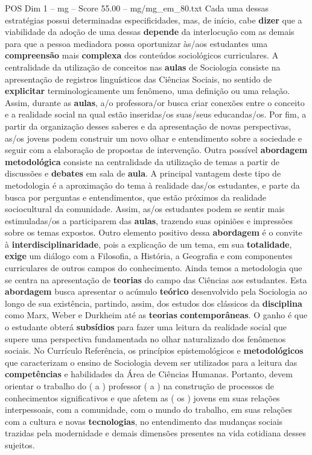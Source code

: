 \begin{textsample}{POS Dim 1 – mg – Score 55.00 – mg/mg\_em\_80.txt}
Cada uma dessas estratégias possui determinadas especificidades, mas, de início, cabe \textbf{dizer} que a viabilidade da adoção de uma dessas \textbf{depende} da interlocução com as demais para que a pessoa mediadora possa oportunizar às/aos estudantes uma \textbf{compreensão} mais \textbf{complexa} dos conteúdos sociológicos curriculares.
A centralidade da utilização de conceitos nas \textbf{aulas} de Sociologia consiste na apresentação de registros linguísticos das Ciências Sociais, no sentido de \textbf{explicitar} terminologicamente um fenômeno, uma definição ou uma relação.
Assim, durante as \textbf{aulas}, a/o professora/or busca criar conexões entre o conceito e a realidade social na qual estão inseridas/os suas/seus educandas/os.
Por fim, a partir da organização desses saberes e da apresentação de novas perspectivas, as/os jovens podem construir um novo olhar e entendimento sobre a sociedade e seguir com a elaboração de propostas de intervenção.
Outra possível \textbf{abordagem} \textbf{metodológica} consiste na centralidade da utilização de temas a partir de discussões e \textbf{debates} em sala de \textbf{aula}.
A principal vantagem deste tipo de metodologia é a aproximação do tema à realidade das/os estudantes, e parte da busca por perguntas e entendimentos, que estão próximos da realidade sociocultural da comunidade.
Assim, as/os estudantes podem se sentir mais estimuladas/os a participarem das \textbf{aulas}, trazendo suas opiniões e impressões sobre os temas expostos.
Outro elemento positivo dessa \textbf{abordagem} é o convite à \textbf{interdisciplinaridade}, pois a explicação de um tema, em sua \textbf{totalidade}, \textbf{exige} um diálogo com a Filosofia, a História, a Geografia e com componentes curriculares de outros campos do conhecimento.
Ainda temos a metodologia que se centra na apresentação de \textbf{teorias} do campo das Ciências aos estudantes.
Esta \textbf{abordagem} busca apresentar o acúmulo \textbf{teórico} desenvolvido pela Sociologia ao longo de sua existência, partindo, assim, dos estudos dos clássicos da \textbf{disciplina} como Marx, Weber e Durkheim até as \textbf{teorias} \textbf{contemporâneas}.
O ganho é que o estudante obterá \textbf{subsídios} para fazer uma leitura da realidade social que supere uma perspectiva fundamentada no olhar naturalizado dos fenômenos sociais.
No Currículo Referência, os princípios epistemológicos e \textbf{metodológicos} que caracterizam o ensino de Sociologia devem ser utilizados para a leitura das \textbf{competências} e habilidades da Área de Ciências Humanas.
Portanto, devem orientar o trabalho do ( a ) professor ( a ) na construção de processos de conhecimentos significativos e que afetem as ( os ) jovens em suas relações interpessoais, com a comunidade, com o mundo do trabalho, em suas relações com a cultura e novas \textbf{tecnologias}, no entendimento das mudanças sociais trazidas pela modernidade e demais dimensões presentes na vida cotidiana desses sujeitos.

\end{textsample}

